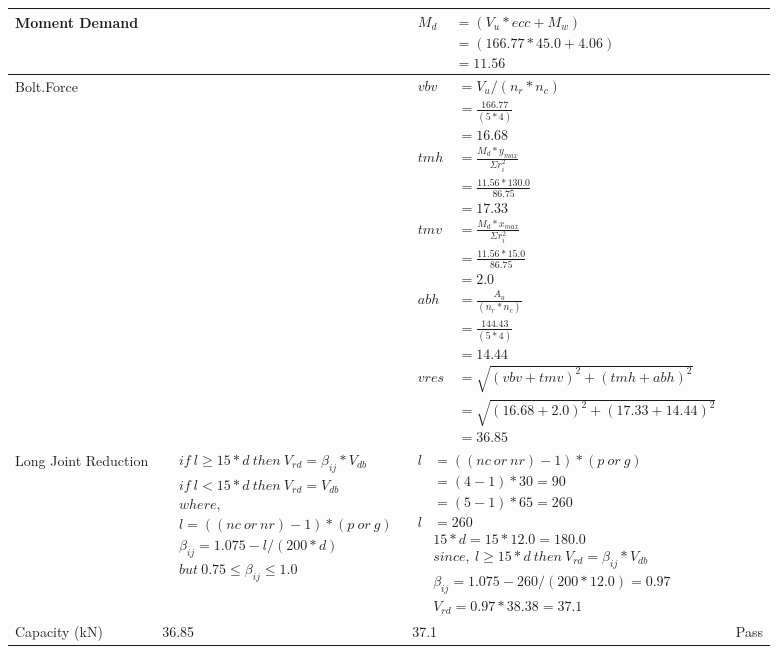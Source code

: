 \documentclass{article}%
\begin{document}
\begin{longtable}{|p{4cm}|p{5cm}|p{6.5cm}|p{1.5cm}|}
\hline%
Moment Demand&&$\begin{aligned}  M_d~~ &= (V_u * ecc + M_w)\\  &= (166.77 * 45.0 + 4.06)\\  & =11.56\end{aligned}$&\\%
\hline%
Bolt.Force&&$\begin{aligned} vbv~~ &= V_u / (n_r * n_c)\\  &= \frac{166.77}{ (5*4)}\\  & =16.68\\ tmh~ &= \frac{M_d * y_{max} }{ \Sigma r_i^2} \\  &= \frac{11.56 *130.0}{86.75}\\  & =17.33\\  tmv ~&= \frac{M_d * x_{max}}{\Sigma r_i^2}\\ &= \frac{11.56 * 15.0}{86.75}\\  & =2.0\\  abh~ & = \frac{A_u }{(n_r * n_c)}\\   & =\frac{144.43}{ (5 *4)}\\  & =14.44\\  vres &=\sqrt{(vbv +tmv) ^ 2 + (tmh+abh) ^ 2}\\   &= \sqrt{(16.68 +2.0) ^2 + (17.33+14.44) ^ 2}\\  & =36.85\end{aligned}$&\\%
\hline%
Long Joint Reduction&$\begin{aligned} &if~l\geq 15 * d~then~V_{rd} = \beta_{ij} * V_{db} \\ & if~l < 15 * d~then~V_{rd} = V_{db} \\ & where,\\ & l = ((nc~or~nr) - 1) * (p~or~g) \\ & \beta_{ij} = 1.075 - l/(200 * d) \\ & but~0.75\leq\beta_{ij}\leq1.0 \end{aligned}$&$\begin{aligned} l&= ((nc~or~nr) - 1) * (p~or~g) \\  &= (4 - 1) * 30=90\\  &= (5 - 1) * 65=260\\  l&= 260\\ & 15 * d = 15 * 12.0 = 180.0 \\ & since,~l \geq 15 * d~then~V_{rd} = \beta_{ij} * V_{db} \\ & \beta_{ij} = 1.075 - 260/(200*12.0) =0.97\\ & V_{rd} = 0.97 * 38.38=37.1 \end{aligned}$&\\%
\hline%
Capacity (kN)&36.85&37.1&Pass\\%
\hline%
\end{longtable}
\end{document}
